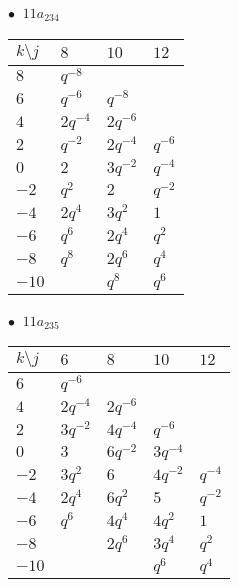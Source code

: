 \begin{minipage}{\linewidth}
$\bullet\ $ $11a_{234}$ \vspace{0.5em} \\
\begin{tabular}{l|lll}
$k \setminus j$ & $8$ & $10$ & $12$ \\
\hline
$8$ & $q^{-8}$ &  &  \\
$6$ & $q^{-6}$ & $q^{-8}$ &  \\
$4$ & $2q^{-4}$ & $2q^{-6}$ &  \\
$2$ & $q^{-2}$ & $2q^{-4}$ & $q^{-6}$ \\
$0$ & $2$ & $3q^{-2}$ & $q^{-4}$ \\
$-2$ & $q^{2}$ & $2$ & $q^{-2}$ \\
$-4$ & $2q^{4}$ & $3q^{2}$ & $1$ \\
$-6$ & $q^{6}$ & $2q^{4}$ & $q^{2}$ \\
$-8$ & $q^{8}$ & $2q^{6}$ & $q^{4}$ \\
$-10$ &  & $q^{8}$ & $q^{6}$ \\
\end{tabular}
\vspace{2em}
\end{minipage}
%
\begin{minipage}{\linewidth}
$\bullet\ $ $11a_{235}$ \vspace{0.5em} \\
\begin{tabular}{l|llll}
$k \setminus j$ & $6$ & $8$ & $10$ & $12$ \\
\hline
$6$ & $q^{-6}$ &  &  &  \\
$4$ & $2q^{-4}$ & $2q^{-6}$ &  &  \\
$2$ & $3q^{-2}$ & $4q^{-4}$ & $q^{-6}$ &  \\
$0$ & $3$ & $6q^{-2}$ & $3q^{-4}$ &  \\
$-2$ & $3q^{2}$ & $6$ & $4q^{-2}$ & $q^{-4}$ \\
$-4$ & $2q^{4}$ & $6q^{2}$ & $5$ & $q^{-2}$ \\
$-6$ & $q^{6}$ & $4q^{4}$ & $4q^{2}$ & $1$ \\
$-8$ &  & $2q^{6}$ & $3q^{4}$ & $q^{2}$ \\
$-10$ &  &  & $q^{6}$ & $q^{4}$ \\
\end{tabular}
\vspace{2em}
\end{minipage}
%
